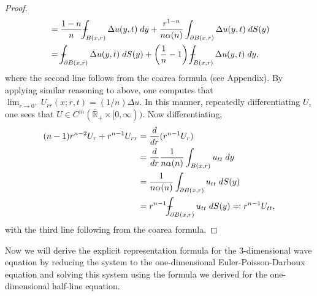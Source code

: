 \documentclass{article}
\def\Xint#1{\mathchoice
	{\XXint\displaystyle\textstyle{#1}}%
	{\XXint\textstyle\scriptstyle{#1}}%
	{\XXint\scriptstyle\scriptscriptstyle{#1}}%
	{\XXint\scriptscriptstyle\scriptscriptstyle{#1}}%
	\!\int}
\def\XXint#1#2#3{{\setbox0=\hbox{$#1{#2#3}{\int}$ }
		\vcenter{\hbox{$#2#3$ }}\kern-0.6\wd0}}
\def\dashint{\Xint-}
\begin{document}
\begin{proof}
\begin{align*}
\begin{split}
			&= \frac{1 - n}{n}\dashint_{B(x, r)}\Delta u(y,t)\;dy + \frac{r^{1-n}}{n\alpha(n)}\int_{\partial B(x, r)}\Delta u(y,t)\;dS(y) \\
			&= \dashint_{\partial B(x, r)}\Delta u(y, t)\;dS(y) + \left(\frac{1}{n} - 1\right)\dashint_{B(x, r)}\Delta u(y, t)\;dy, 
		\end{split}
	\end{align*}
	where the second line follows from the coarea formula (see Appendix). By applying similar reasoning to above, one computes that $\lim_{r \to 0^{+}}U_{rr}(x;r, t) = (1/n)\Delta u$. In this manner, repeatedly differentiating $U$, one sees that $U \in C^{m}(\overline{\mathbb{R}}_{+} \times [0, \infty))$. Now differentiating, 
	\begin{align*}
		\begin{split}
			(n-1)r^{n - 2}U_{r} + r^{n-1}U_{rr} &= \frac{d}{dr}(r^{n-1}U_{r}) \\
			&= \frac{d}{dr}\frac{1}{n\alpha(n)}\int_{B(x,r)}u_{tt}\;dy  \\
			&= \frac{1}{n\alpha(n)}\int_{\partial B(x,r)}u_{tt}\;dS(y)  \\
			&= r^{n-1}\dashint_{\partial B(x, r)}u_{tt}\;dS(y) \eqqcolon r^{n-1}U_{tt}, 
		\end{split}
	\end{align*}
	with the third line following from the coarea formula. 
\end{proof}

Now we will derive the explicit representation formula for the 3-dimensional wave equation by reducing the system to the one-dimensional Euler-Poisson-Darboux equation and solving this system using the formula we derived for the one-dimensional half-line equation. 
\end{document}
